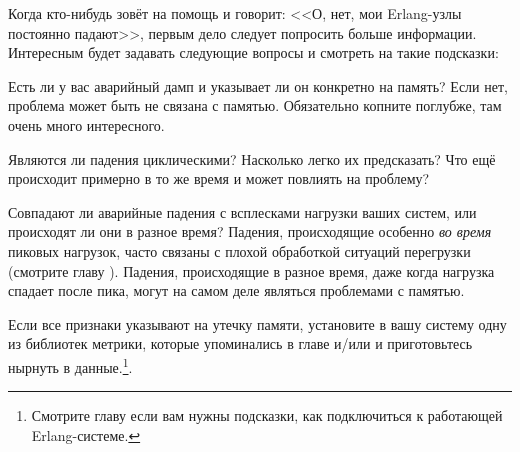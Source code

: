 Когда кто-нибудь зовёт на помощь и говорит: <<О, нет, мои Erlang-узлы постоянно падают>>, первым дело следует попросить больше информации. Интересным будет задавать следующие вопросы и смотреть на такие подсказки:

\begin{itemize*}
	\item Есть ли у вас аварийный дамп и указывает ли он конкретно на память? Если нет, проблема может быть не связана с памятью. Обязательно копните поглубже, там очень много интересного.
	\item Являются ли падения циклическими? Насколько легко их предсказать? Что ещё происходит примерно в то же время и может повлиять на проблему?
	\item  Совпадают ли аварийные падения с всплесками нагрузки ваших систем, или происходят ли они в разное время? Падения, происходящие особенно \emph{во время} пиковых нагрузок, часто связаны с плохой обработкой ситуаций перегрузки (смотрите главу ). Падения, происходящие в разное время, даже когда нагрузка спадает после пика, могут на самом деле являться проблемами с памятью.
\end{itemize*}

Если все признаки указывают на утечку памяти, установите в вашу систему одну из библиотек метрики, которые упоминались в главе  и/или  и приготовьтесь нырнуть в данные.\footnote{Смотрите главу  если вам нужны подсказки, как подключиться к работающей Erlang-системе.}.

